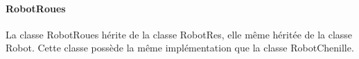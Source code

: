 \documentclass[10pt]{report}
\begin{document}
\paragraph{RobotRoues}La classe RobotRoues hérite de la classe RobotRes, elle même héritée de la classe Robot. Cette classe possède la même implémentation que la classe RobotChenille.
\end{document}
